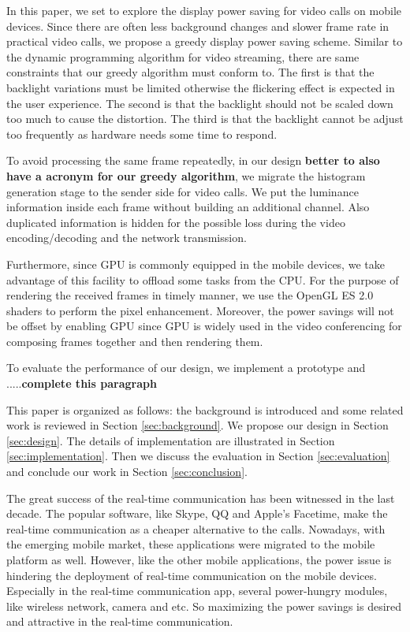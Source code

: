 In this paper, we set to explore the display power saving for video
calls on mobile devices. Since there are often less background changes
and slower frame rate in practical video calls, we propose a greedy
display power saving scheme.  Similar to the dynamic programming
algorithm for video streaming, there are same constraints that our
greedy algorithm must conform to. The first is that the backlight
variations must be limited otherwise the flickering effect is expected
in the user experience. The second is that the backlight should not be
scaled down too much to cause the distortion.  The third is that the
backlight cannot be adjust too frequently as hardware needs some time
to respond.


To avoid processing the same frame repeatedly, in our design {\bf
  better to also have a acronym for our greedy algorithm}, we migrate
the histogram generation stage to the sender side for video calls. We
put the luminance information inside each frame without building an
additional channel. Also duplicated information is hidden for the
possible loss during the video encoding/decoding and the network
transmission.

Furthermore, since GPU is commonly equipped in the mobile devices, we
take advantage of this facility to offload some tasks from the
CPU. For the purpose of rendering the received frames in timely
manner, we use the OpenGL ES 2.0 shaders to perform the pixel
enhancement.  Moreover, the power savings will not be offset by
enabling GPU since GPU is widely used in the video conferencing for
composing frames together and then rendering them.

To evaluate the performance of our design, we implement a prototype
and .....{\bf complete this paragraph}

This paper is organized as follows: the background is introduced and
some related work is reviewed in Section \ref{sec:background}. We propose
our design in Section \ref{sec:design}. The details of implementation
are illustrated in Section \ref{sec:implementation}. Then we discuss
the evaluation in Section \ref{sec:evaluation} and conclude our work
in Section \ref{sec:conclusion}.


The great success of the real-time communication has been witnessed in
the last decade. The popular software, like Skype, QQ and Apple's
Facetime, make the real-time communication as a cheaper alternative to
the calls. Nowadays, with the emerging mobile market, these
applications were migrated to the mobile platform as well. However,
like the other mobile applications, the power issue is hindering the
deployment of real-time communication on the mobile
devices. Especially in the real-time communication app, several
power-hungry modules, like wireless network, camera and etc. So
maximizing the power savings is desired and attractive in the
real-time communication.


